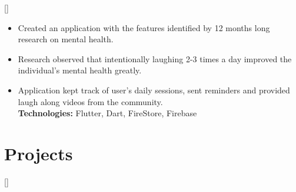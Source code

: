 \documentclass{article}
\begin{document}
[]
\begin{itemize}
    \item Created an application with the features identified by 12 months long research on mental health.
    \item Research observed that intentionally laughing 2-3 times a day improved the individual's mental health greatly.
    \item Application kept track of user's daily sessions, sent reminders and provided laugh along videos from the community.\\
\textbf{Technologies:} Flutter, Dart, FireStore, Firebase
\end{itemize}





 
\section{Projects}


[] 
\end{document}
